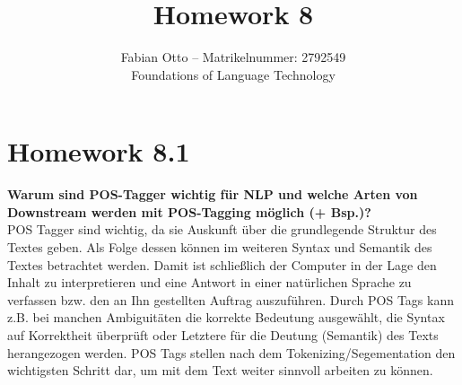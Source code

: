 \documentclass[12pt]{article}
\begin{document}
    \title{Homework 8}
    \author{Fabian Otto -- Matrikelnummer: 2792549\\
    Foundations of Language Technology}
    \maketitle

    \section*{Homework 8.1}

    \noindent\textbf{Warum sind POS-Tagger wichtig für NLP und welche Arten von Downstream werden mit POS-Tagging möglich (+ Bsp.)?}\\
    POS Tagger sind wichtig, da sie Auskunft über die grundlegende Struktur des Textes geben.
    Als Folge dessen können im weiteren Syntax und Semantik des Textes betrachtet werden.
    Damit ist schließlich der Computer in der Lage den Inhalt zu interpretieren und eine Antwort in einer natürlichen Sprache zu verfassen bzw. den an Ihn gestellten Auftrag auszuführen.
    Durch POS Tags kann z.B. bei manchen Ambiguitäten die korrekte Bedeutung ausgewählt, die Syntax auf Korrektheit überprüft oder Letztere für die Deutung (Semantik) des Texts herangezogen werden.
    POS Tags stellen nach dem Tokenizing/Segementation den wichtigsten Schritt dar, um mit dem Text weiter sinnvoll arbeiten zu können.
\end{document}
